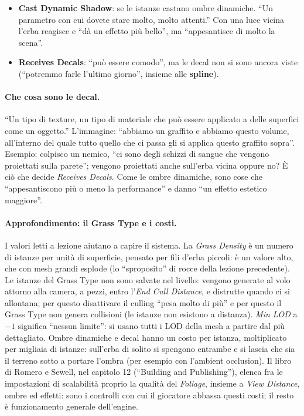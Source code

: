 \begin{itemize}
        cresce dritta. Con l'erba non si vuole quasi mai togliere, ``ma magari se state usando
        questa cosa per piazzare degli alberi'' è utile che crescano in verticale, ``perché
        l'albero cresce cercando il sole'', ``un pino, un abete'', per esempio in una tundra.
  \item \textbf{Cast Dynamic Shadow}: se le istanze castano ombre dinamiche. ``Un parametro con
        cui dovete stare molto, molto attenti.'' Con una luce vicina l'erba reagisce e ``dà un
        effetto più bello'', ma ``appesantisce di molto la scena''.
  \item \textbf{Receives Decals}: ``può essere comodo'', ma le decal non si sono ancora viste
        (``potremmo farle l'ultimo giorno'', insieme alle \textbf{spline}).
\end{itemize}

\paragraph{Che cosa sono le decal.} ``Un tipo di texture, un tipo di materiale che può essere
applicato a delle superfici come un oggetto.'' L'immagine: ``abbiamo un graffito e abbiamo
questo volume, all'interno del quale tutto quello che ci passa gli si applica questo graffito
sopra''. Esempio: colpisco un nemico, ``ci sono degli schizzi di sangue che vengono proiettati
sulla parete''; vengono proiettati anche sull'erba vicina oppure no? È ciò che decide
\emph{Receives Decals}. Come le ombre dinamiche, sono cose che ``appesantiscono più o meno la
performance'' e danno ``un effetto estetico maggiore''.

\paragraph{Approfondimento: il Grass Type e i costi.} I valori letti a lezione aiutano a
capire il sistema. La \emph{Grass Density} è un numero di istanze per unità di superficie, pensato per
fili d'erba piccoli: è un valore alto, che con mesh grandi esplode (lo ``sproposito'' di
rocce della lezione precedente). Le
istanze del Grass Type non sono salvate nel livello: vengono generate al volo attorno alla
camera, a pezzi, entro l'\emph{End Cull Distance}, e distrutte quando ci si allontana; per
questo disattivare il culling ``pesa molto di più'' e per questo il Grass Type non genera
collisioni (le istanze non esistono a distanza). \emph{Min LOD} a $-1$ significa ``nessun
limite'': si usano tutti i LOD della mesh a partire dal più dettagliato. Ombre dinamiche e
decal hanno un costo per istanza, moltiplicato per migliaia di istanze: sull'erba di solito
si spengono entrambe e si lascia che sia il terreno sotto a portare l'ombra (per esempio con
l'ambient occlusion). Il libro di Romero e Sewell, nel capitolo 12 (``Building and
Publishing''), elenca fra le impostazioni di scalabilità proprio la qualità del
\emph{Foliage}, insieme a \emph{View Distance}, ombre ed effetti: sono i controlli con cui il
giocatore abbassa questi costi; il resto è funzionamento generale dell'engine.

